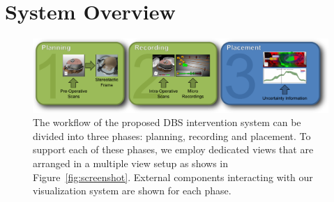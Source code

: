 \documentclass[review]{vgtc}                 %
\begin{document}

%
%

\section{System Overview}\label{sec:overview}
\begin{figure}[t]
    \centering
    \includegraphics[width=0.8\linewidth]{figures/workflow}
    \caption{The workflow of the proposed DBS intervention system can be divided into three phases: planning, recording and placement. To support each of these phases, we employ dedicated views that are arranged in a multiple view setup as shows in Figure~\ref{fig:screenshot}. External components interacting with our visualization system are shown for each phase.}
    \label{fig:workflow}
\end{figure}
\end{document}
